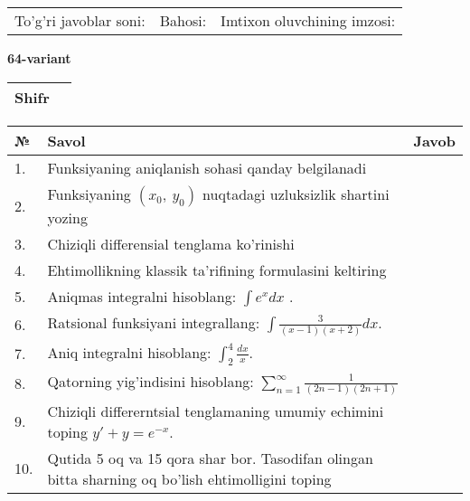 \documentclass{article}
\begin{document}
  \vspace{1cm}
  
  \begin{tabular}{lll}
  To'g'ri javoblar soni: \underline{\hspace{1.5cm}} & 
  Bahosi: \underline{\hspace{1.5cm}} & 
  Imtixon oluvchining imzosi: \underline{\hspace{2cm}} \\
  \end{tabular}
  
  \egroup
  
  \newpage
  
  
  \textbf{64-variant}\\
  
  \bgroup
  \def\arraystretch{1.6} %
  
  \begin{tabular}{|m{5.7cm}|m{9.5cm}|}
  \hline
  Shifr & \\
  \hline
  \end{tabular}
  
  \vspace{1cm}
  
  \begin{tabular}{|m{0.7cm}|m{10cm}|m{4cm}|}
  \hline
  № & Savol & Javob \\
  \hline
  1. & Funksiyaning aniqlanish sohasi qanday belgilanadi &  \\
  \hline
  2. & Funksiyaning \((x_{0},\ y_{0})\) nuqtadagi uzluksizlik shartini yozing &  \\
  \hline
  3. & Chiziqli differensial tenglama ko'rinishi &  \\
  \hline
  4. & Ehtimollikning klassik ta'rifining formulasini keltiring &  \\
  \hline
  5. & Aniqmas integralni hisoblang: \(\int {e^{x}dx}\) . &  \\
  \hline
  6. & Ratsional funksiyani integrallang: \(\int {\frac{3}{(x - 1)(x + 2)}dx}\). &  \\
  \hline
  7. & Aniq integralni hisoblang: \(\int_{2}^{4}\frac{dx}{x}\). &  \\
  \hline
  8. & Qatorning yig'indisini hisoblang: \(\sum_{n = 1}^{\infty}\frac{1}{(2n - 1)(2n + 1)}\) &  \\
  \hline
  9. & Chiziqli differerntsial tenglamaning umumiy echimini toping \(y' + y = e^{- x}\). &  \\
  \hline
  10. & Qutida 5 oq va 15 qora shar bor. Tasodifan olingan bitta sharning oq bo'lish ehtimolligini toping &  \\
  \hline
  \end{tabular}
  
\end{document}

